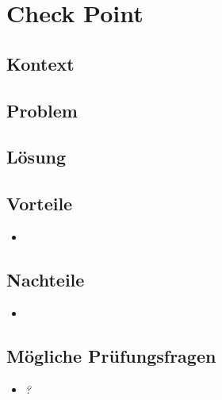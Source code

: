 \section{Check Point}
\label{sec:checkpoint}



\subsection*{Kontext}


\subsection*{Problem}

\subsection*{Lösung}

\subsection*{Vorteile}
\begin{itemize}
	\item 
\end{itemize}

\subsection*{Nachteile}
\begin{itemize}
	\item 
\end{itemize}

\subsection*{Mögliche Prüfungsfragen}
\begin{itemize}
	\item \emph{?}\\
	
\end{itemize}